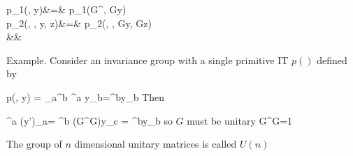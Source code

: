 \beqa
p_1(, y)&=&
p_1(G^\dagger, Gy)
\\
p_2(, , {y}, {z})&=&
p_2(, 
, Gy,
Gz)
\\
&&
\eeqa


Example. Consider
an invariance group
with a single
primitive IT $p()$ defined by

\beq
p(, y) = \delta_a^b ^a y_b=^by_b
\eeq
Then

\beq
{}^a (y')_a=
^b (G^\dagger G)y_c = ^by_b
\eeq
so $G$ must be unitary
\beq
G^\dagger G=1
\eeq
 
The group of $n$ dimensional unitary matrices is called $U(n)$



